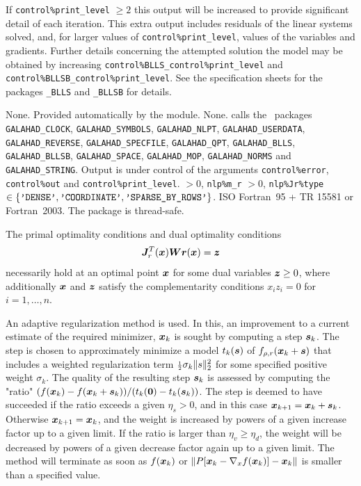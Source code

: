 \documentclass{galahad}
\newcommand{\packagename}{BNLS}
\begin{document}
If {\tt control\%print\_level} $\geq 2$ this
output will be increased to provide significant detail of each iteration.
This extra output includes residuals of the linear systems solved, and,
for larger values of {\tt control\%print\_level}, values of the variables
and gradients. Further details concerning the attempted solution the model
may be obtained by increasing
{\tt control\%BLLS\_control\%print\_level}
and
{\tt control\%BLLSB\_control\%print\_level}.
See the specification sheets for the packages
{\tt \libraryname\_BLLS} and {\tt \libraryname\_BLLSB}
for details.


\galgeneral

\galcommon None.
\galworkspace Provided automatically by the module.
\galroutines None.
\galmodules {\tt \packagename\_solve} calls the \galahad\ packages
{\tt GALAHAD\_CLOCK},
{\tt GALAHAD\_SY\-M\-BOLS},
{\tt GALA\-HAD\-\_NLPT},
{\tt GALAHAD\_USERDATA},
{\tt GALAHAD\_REVERSE},
{\tt GALAHAD\_SPECFILE},
{\tt GALAHAD\_QPT},
{\tt GALAHAD\_BLLS},
{\tt GALA\-HAD\_BLLSB},
{\tt GALAHAD\_\-SPACE},
{\tt GALAHAD\_MOP},
{\tt GALAHAD\_NORMS}
and
{\tt GALAHAD\_STRING}.
\galio Output is under control of the arguments
 {\tt control\%error}, {\tt control\%out} and
{\tt control\%print\_level}.
 $> 0$, {\tt nlp\%m\_r} $> 0$,
{\tt nlp\%Jr\%type} $\in \{
  \mbox{\tt 'DENSE'}, \mbox{\tt 'COORDINATE'}, \mbox{\tt 'SPARSE\_BY\_ROWS'}\}$.
\galportability ISO Fortran~95 + TR 15581 or Fortran~2003.
The package is thread-safe.


\galmethod
The primal optimality conditions  and dual optimality conditions
\[{\bm{J}}_r^T({\bm{x}}) {\bm{W}} {\bm{r}}({\bm{x}}) = {\bm{z}}\]
necessarily hold at an optimal point ${\bm{x}}$ for some 
dual variables ${\bm{z}} \geq 0$, where additionally ${\bm{x}}$ and ${\bm{z}}$ 
satisfy the complementarity conditions $x_i z_i = 0$ for $i=1,\ldots,n$.

An adaptive regularization method is used.
In this, an improvement to a current
estimate of the required minimizer, ${\bm{x}}_k$ is sought by computing a
step ${\bm{s}}_k$. The step is chosen to approximately minimize a model $t_k({\bm{s}})$
of $f_{\rho,r}({\bm{x}}_k+{\bm{s}})$ that includes a weighted regularization term
${\scriptstyle \frac{1}{2}} \sigma_k \|s\|_2^2$
for some specified positive weight $\sigma_k$. The quality of the
resulting step ${\bm{s}}_k$ is assessed by computing the "ratio"
$(f({\bm{x}}_k) - f({\bm{x}}_k + {\bm{s}}_k))/(t_k({\bm{0}}) - t_k({\bm{s}}_k))$.
The step is deemed to have succeeded if the ratio exceeds a given $\eta_s > 0$,
and in this case ${\bm{x}}_{k+1} = {\bm{x}}_k + {\bm{s}}_k$. Otherwise
${\bm{x}}_{k+1} = {\bm{x}}_k$, and the weight is increased by powers of a given
increase factor up to a given limit. If the ratio is larger than
$\eta_v \geq \eta_d$, the weight will be decreased by powers of a given
decrease factor again up to a given limit. The method will terminate
as soon as $f({\bm{x}}_k)$ or
$\|P[{\bm{x}}_k - \nabla_x f({\bm{x}}_k)]-{\bm{x}}_k\|$ is smaller than a specified value.
\end{document}

